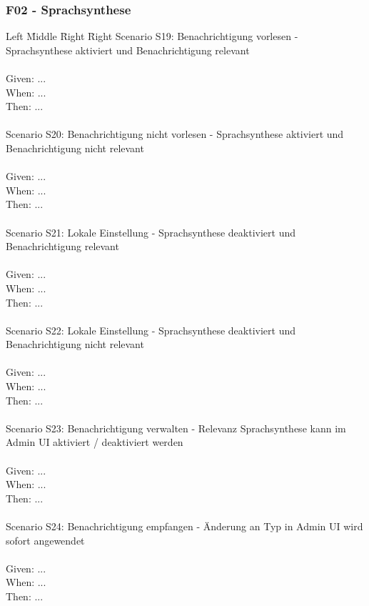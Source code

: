 \subsubsection*{F02 - Sprachsynthese}
\begin{tabbing}
    Left \= Middle \= Right \= Right \kill
    Scenario S19: \> \> \> Benachrichtigung vorlesen - Sprachsynthese aktiviert und Benachrichtigung relevant \\ \\
    Given:  \> \> \> ...\\
    When:   \> \> \> ...\\
    Then:   \> \> \> ...\\
    \\
    Scenario S20: \> \> \> Benachrichtigung nicht vorlesen - Sprachsynthese aktiviert und Benachrichtigung nicht relevant \\ \\
    Given:  \> \> \> ...\\
    When:   \> \> \> ...\\
    Then:   \> \> \> ...\\
    \\
    Scenario S21: \> \> \> Lokale Einstellung - Sprachsynthese deaktiviert und Benachrichtigung relevant \\ \\
    Given:  \> \> \> ...\\
    When:   \> \> \> ...\\
    Then:   \> \> \> ...\\
    \\
    Scenario S22: \> \> \> Lokale Einstellung - Sprachsynthese deaktiviert und Benachrichtigung nicht relevant \\ \\
    Given:  \> \> \> ...\\
    When:   \> \> \> ...\\
    Then:   \> \> \> ...\\
    \\
    Scenario S23: \> \> \> Benachrichtigung verwalten - Relevanz Sprachsynthese kann im Admin UI aktiviert / deaktiviert werden \\ \\
    Given:  \> \> \> ...\\
    When:   \> \> \> ...\\
    Then:   \> \> \> ...\\
    \\
    Scenario S24: \> \> \> Benachrichtigung empfangen - Änderung an Typ in Admin UI wird sofort angewendet \\ \\
    Given:  \> \> \> ...\\
    When:   \> \> \> ...\\
    Then:   \> \> \> ...\\
    \\
\end{tabbing}
